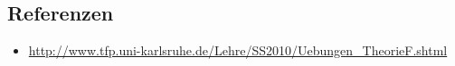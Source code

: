 \subsection*{Referenzen}
\begin{itemize}
\item \url{http://www.tfp.uni-karlsruhe.de/Lehre/SS2010/Uebungen_TheorieF.shtml}
\end{itemize}


